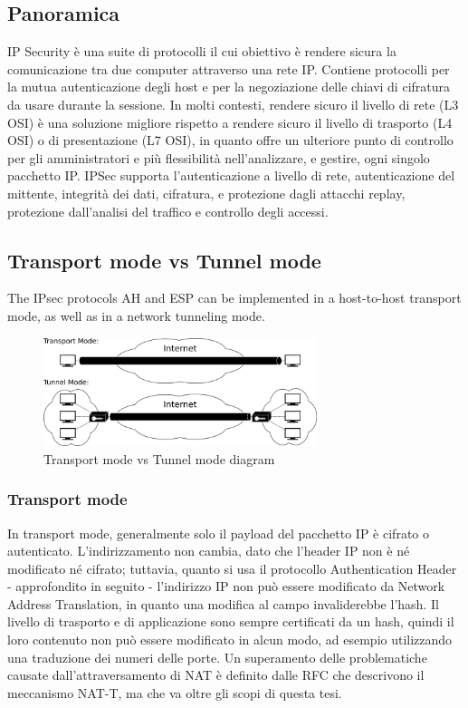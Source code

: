 \subsection{Panoramica}
IP Security è una suite di protocolli il cui obiettivo è rendere sicura la comunicazione tra due computer attraverso una rete IP.
Contiene protocolli per la mutua autenticazione degli host e per la negoziazione delle chiavi di cifratura da usare durante la sessione.
In molti contesti, rendere sicuro il livello di rete (L3 OSI) è una soluzione migliore rispetto a rendere sicuro il livello di trasporto (L4 OSI) o di presentazione (L7 OSI), in quanto offre un ulteriore punto di controllo per gli amministratori e più flessibilità nell'analizzare, e gestire, ogni singolo pacchetto IP.
IPSec supporta l'autenticazione a livello di rete, autenticazione del mittente, integrità dei dati, cifratura, e protezione dagli attacchi replay, protezione dall'analisi del traffico e controllo degli accessi.

\subsection{Transport mode vs Tunnel mode}
The IPsec protocols AH and ESP can be implemented in a host-to-host transport mode, as well as in a network tunneling mode.

\begin{figure}[ht]
    \centering
    \includegraphics[width=8cm]{figure/ipsec_modes.png}
    \caption{Transport mode vs Tunnel mode diagram}
\end{figure}


\subsubsection{Transport mode}
In transport mode, generalmente solo il payload del pacchetto IP è cifrato o autenticato. L'indirizzamento non cambia, dato che l'header IP non è né modificato né cifrato; tuttavia, quanto si usa il protocollo Authentication Header - approfondito in seguito - l'indirizzo IP non può essere modificato da Network Address Translation, in quanto una modifica al campo invaliderebbe l'hash. Il livello di trasporto e di applicazione sono sempre certificati da un hash, quindi il loro contenuto non può essere modificato in alcun modo, ad esempio utilizzando una traduzione dei numeri delle porte.
Un superamento delle problematiche causate dall'attraversamento di NAT è definito dalle RFC che descrivono il meccanismo NAT-T, ma che va oltre gli scopi di questa tesi.

